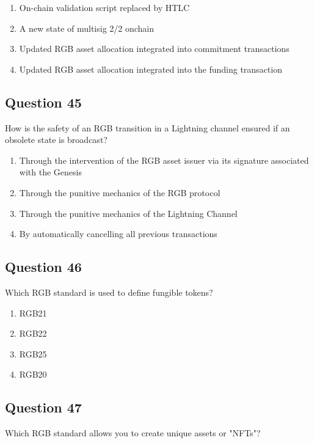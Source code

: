 \documentclass[12pt,a4paper]{article}
\begin{document}
\begin{enumerate}[label=\Alph*., leftmargin=*]
\item On-chain validation script replaced by HTLC
\item A new state of multisig 2/2 onchain
\item Updated RGB asset allocation integrated into commitment transactions
\item Updated RGB asset allocation integrated into the funding transaction
\end{enumerate}

\bigskip


\subsection*{Question 45}
How is the safety of an RGB transition in a Lightning channel ensured if an obsolete state is broadcast?

\begin{enumerate}[label=\Alph*., leftmargin=*]
\item Through the intervention of the RGB asset issuer via its signature associated with the Genesis
\item Through the punitive mechanics of the RGB protocol
\item Through the punitive mechanics of the Lightning Channel
\item By automatically cancelling all previous transactions
\end{enumerate}

\bigskip


\subsection*{Question 46}
Which RGB standard is used to define fungible tokens?

\begin{enumerate}[label=\Alph*., leftmargin=*]
\item RGB21
\item RGB22
\item RGB25
\item RGB20
\end{enumerate}

\bigskip


\subsection*{Question 47}
Which RGB standard allows you to create unique assets or "NFTs"?
\end{document}
